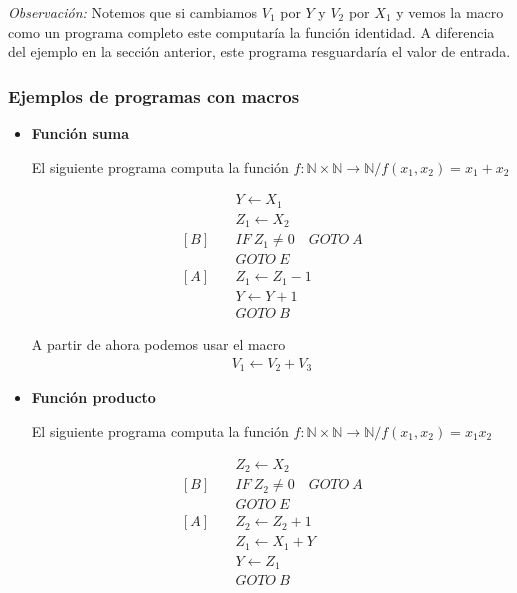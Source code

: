 \begin{itemize}
        \bigskip
        \textit{Observación:}
        Notemos que si cambiamos $V_1$ por $Y$ y $V_2$ por $X_1$ y vemos la
        macro como un programa completo este computaría la función identidad.
        A diferencia del ejemplo en la sección anterior, este programa 
        resguardaría el valor de entrada.
\end{itemize}

\subsubsection{Ejemplos de programas con macros}

\begin{itemize}
    \item \textbf{Función suma} \label{ej:funcion-suma}

        El siguiente programa computa la función 
        $f: \mathbb{N} \times \mathbb{N} \to \mathbb{N}/f(x_1, x_2) = x_1+x_2$

        \begin{align*}
                        &Y \gets X_1 \\
                        &Z_1 \gets X_2 \\
            [B] \quad &IF ~ Z_1 \neq 0 \quad GOTO ~ A \\
                        &GOTO ~ E \\
            [A] \quad &Z_1 \gets Z_1 - 1 \\
                        &Y \gets Y + 1 \\
                        &GOTO ~ B
        \end{align*}

        A partir de ahora podemos usar el macro
        \begin{gather*}
            V_1 \gets V_2 + V_3
        \end{gather*}

    \item \textbf{Función producto} \label{ej:funcion-producto}

        El siguiente programa computa la función 
        $f: \mathbb{N} \times \mathbb{N} \to \mathbb{N}/f(x_1, x_2) = x_1 x_2$

        \begin{align*}
                        &Z_2 \gets X_2 \\
            [B] \quad &IF ~ Z_2 \neq 0 \quad GOTO ~ A \\
                        &GOTO ~ E \\
            [A] \quad &Z_2 \gets Z_2 + 1 \\
                        &Z_1 \gets X_1 + Y \\
                        &Y \gets Z_1 \\
                        &GOTO ~ B
        \end{align*}


\end{itemize}
